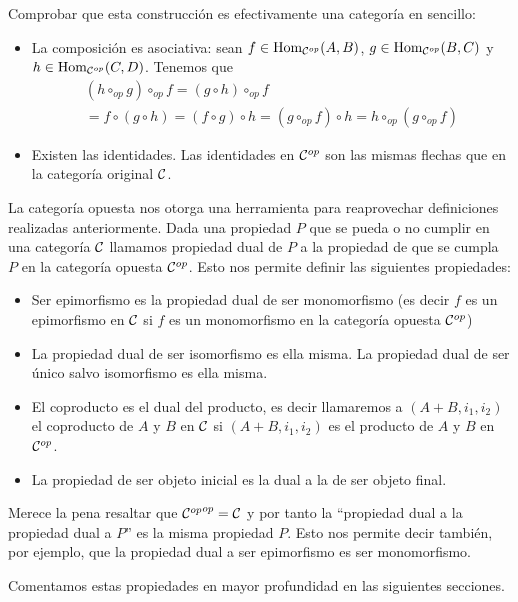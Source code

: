 Comprobar que esta construcción es efectivamente una categoría
en sencillo:
\begin{itemize}
\item La composición es asociativa: sean
$f \in \operatorname{Hom}_{\mathcal{C}^{op}}(A, B)$, $g \in \operatorname{Hom}_{\mathcal{C}^{op}}(B, C)$
y $h \in \operatorname{Hom}_{\mathcal{C}^{op}}(C, D)$. Tenemos que
\begin{multline*}
(h \circ_{op} g) \circ_{op} f = (g \circ h) \circ_{op} f \\
= f \circ (g \circ h)
= (f \circ g) \circ h
= (g \circ_{op} f)  \circ h
= h \circ_{op} (g \circ_{op} f)
\end{multline*}
\item Existen las identidades. Las identidades en $\mathcal{C}^{op}$
son las mismas flechas que en la categoría original $\mathcal{C}$.
\end{itemize}

La categoría opuesta nos otorga una herramienta para reaprovechar
definiciones realizadas anteriormente. Dada una propiedad $P$ que
se pueda o no cumplir en una categoría $\mathcal{C}$ llamamos propiedad
dual de $P$ a la propiedad de que se cumpla $P$ en la categoría opuesta
$\mathcal{C}^{op}$. Esto nos permite definir las siguientes propiedades:

\begin{itemize}
\item Ser epimorfismo es la propiedad dual de ser monomorfismo (es decir
$f$ es un epimorfismo en $\mathcal{C}$ si $f$ es un monomorfismo en la categoría opuesta
$\mathcal{C}^{op}$)
\item La propiedad dual de ser isomorfismo es ella misma. La propiedad
dual de ser único salvo isomorfismo es ella misma.
\item El coproducto es el dual del producto, es decir llamaremos
a $(A+B, i_1, i_2)$ el coproducto de $A$ y $B$ en $\mathcal{C}$ si
$(A+B, i_1, i_2)$ es el producto de $A$ y $B$ en $\mathcal{C}^{op}$.
\item La propiedad de ser objeto inicial es la dual a la de ser objeto final.
\end{itemize}

Merece la pena resaltar que ${\mathcal{C}^{op}}^{op} = \mathcal{C}$ y por tanto
la ``propiedad dual a la propiedad dual a $P$'' es la misma propiedad
$P$. Esto nos permite decir también, por ejemplo, que la propiedad
dual a ser epimorfismo es ser monomorfismo.

Comentamos estas propiedades en mayor profundidad en las siguientes
secciones.

